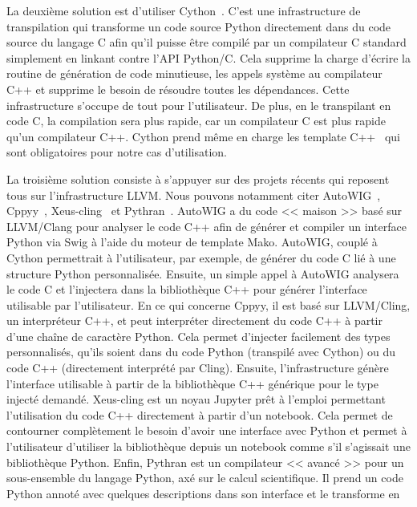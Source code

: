 La deuxième solution est d'utiliser Cython~\parencite{behnel.2010.cython}. C'est une infrastructure de transpilation qui
transforme un code source Python directement dans du code source du langage C afin qu'il puisse être compilé par un
compilateur C standard simplement en linkant contre l'API Python/C. Cela supprime la charge d'écrire la routine de
génération de code minutieuse, les appels système au compilateur C++ et supprime le besoin de résoudre toutes les
dépendances. Cette infrastructure s'occupe de tout pour l'utilisateur. De plus, en le transpilant en code C, la
compilation sera plus rapide, car un compilateur C est plus rapide qu'un compilateur C++. Cython prend même en charge
les template C++~\parencite{behnel.2022.cython-template} qui sont obligatoires pour notre cas d'utilisation.

La troisième solution consiste à s'appuyer sur des projets récents qui reposent tous sur l'infrastructure LLVM. Nous
pouvons notamment citer AutoWIG~\parencite{fernique.2018.autowig}, Cppyy~\parencite{wimtlplavrijsen.2016.cppyy},
Xeus-cling~\parencite{quantstack.2021.xeus-cling} et Pythran~\parencite{guelton.2015.pythran}. AutoWIG a du code <<
maison >> basé sur LLVM/Clang pour analyser le code C++ afin de générer et compiler un interface Python via Swig à
l'aide du moteur de template Mako. AutoWIG, couplé à Cython permettrait à l'utilisateur, par exemple, de générer du code
C lié à une structure Python personnalisée. Ensuite, un simple appel à AutoWIG analysera le code C et l'injectera dans
la bibliothèque C++ pour générer l'interface utilisable par l'utilisateur. En ce qui concerne Cppyy, il est basé sur
LLVM/Cling, un interpréteur C++, et peut interpréter directement du code C++ à partir d'une chaîne de caractère Python.
Cela permet d'injecter facilement des types personnalisés, qu'ils soient dans du code Python (transpilé avec Cython) ou
du code C++ (directement interprété par Cling). Ensuite, l'infrastructure génère l'interface utilisable à partir de la
bibliothèque C++ générique pour le type injecté demandé. Xeus-cling est un noyau Jupyter prêt à l'emploi permettant
l'utilisation du code C++ directement à partir d'un notebook. Cela permet de contourner complètement le besoin d'avoir
une interface avec Python et permet à l'utilisateur d'utiliser la bibliothèque depuis un notebook comme s'il s'agissait
une bibliothèque Python. Enfin, Pythran est un compilateur << avancé >> pour un sous-ensemble du langage Python, axé sur
le calcul scientifique. Il prend un code Python annoté avec quelques descriptions dans son interface et le transforme en
